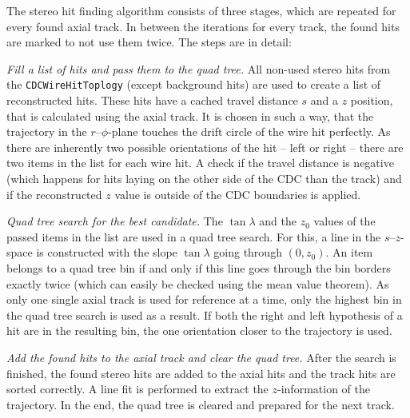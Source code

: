 The stereo hit finding algorithm consists of three stages, which are repeated for every found axial track. In between the iterations for every track, the found hits are marked to not use them twice. The steps are in detail:
\begin{zlist}
  \item \textit{Fill a list of hits and pass them to the quad tree.} All non-used stereo hits from the \texttt{CDCWireHitToplogy} (except background hits) are used to create a list of reconstructed hits. These hits have a cached travel distance $s$ and a $z$ position, that is calculated using the axial track. It is chosen in such a way, that the trajectory in the $r$--$\phi$-plane touches the drift circle of the wire hit perfectly. As there are inherently two possible orientations of the hit -- left or right -- there are two items in the list for each wire hit. A check if the travel distance is negative (which happens for hits laying on the other side of the CDC than the track) and if the reconstructed $z$ value is outside of the CDC boundaries is applied. 
  \item \textit{Quad tree search for the best candidate.} The $\tan \lambda$ and the $z_0$ values of the passed items in the list are used in a quad tree search. For this, a line in the $s$--$z$-space is constructed with the slope $\tan \lambda$ going through $(0, z_0)$. An item belongs to a quad tree bin if and only if this line goes through the bin borders exactly twice (which can easily be checked using the mean value theorem). As only one single axial track is used for reference at a time, only the highest bin in the quad tree search is used as a result. If both the right and left hypothesis of a hit are in the resulting bin, the one orientation closer to the trajectory is used.
  \item \textit{Add the found hits to the axial track and clear the quad tree.} After the search is finished, the found stereo hits are added to the axial hits and the track hits are sorted correctly. A line fit is performed to extract the $z$-information of the trajectory. In the end, the quad tree is cleared and prepared for the next track.
\end{zlist}

